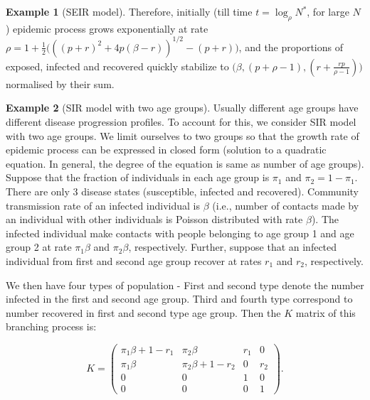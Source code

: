 \documentclass{article}
\theoremstyle{definition}
\newtheorem{example}{Example}
\begin{document}
\begin{example}[SEIR model]
Therefore, initially (till time $t=\log_{\rho} N^*$, for large $N$) epidemic process grows exponentially at rate $\rho =1+\frac{1}{2}\big({((p+r)^2+4p(\beta-r))^{1/2}}-(p+r)\big)$, and the proportions  of exposed, infected and  recovered quickly stabilize to  
$\big(\beta, (p+\rho-1), (r+\frac{rp}{\rho-1})\big)$ normalised by their sum.
\end{example}

\begin{example}[SIR model with two age groups]
Usually different age groups have different disease progression profiles. To account for this, we consider SIR model with two age groups. 
We limit ourselves to two groups  so that the growth rate of epidemic process can be expressed in closed form (solution to a quadratic equation. In general, the degree of the equation is same as number of age groups). Suppose that the fraction of individuals in each age group is $\pi_1$ and $\pi_2=1-\pi_1$.
 There are only 3 disease states (susceptible, infected and recovered). Community transmission rate of an infected individual is $\beta$ (i.e.,  number of contacts made by an individual with other individuals is Poisson distributed with rate $\beta$). The infected individual make contacts with people belonging to age group 1 and age group 2 at rate $\pi_1 \beta$ and $\pi_2 \beta$, respectively. Further, suppose that an infected individual from first and second age group recover at rates  $r_1$ and $r_2$, respectively. 

We then have four types of population - First and second type denote the number infected in the first and second age group.  Third and fourth type
correspond to number recovered in first and second type age group.  Then the $K$ matrix of this branching process is:


\[K=\left(\begin{matrix} \pi_1 \beta + 1 - r_1 & \pi_2 \beta & r_1 & 0 \\ \pi_1 \beta & \pi_2 \beta + 1 - r_2 & 0 & r_2 \\ 0 & 0 & 1 & 0 \\ 0 & 0 & 0 & 1\end{matrix}\right ).\]


\end{example}
\end{document}
